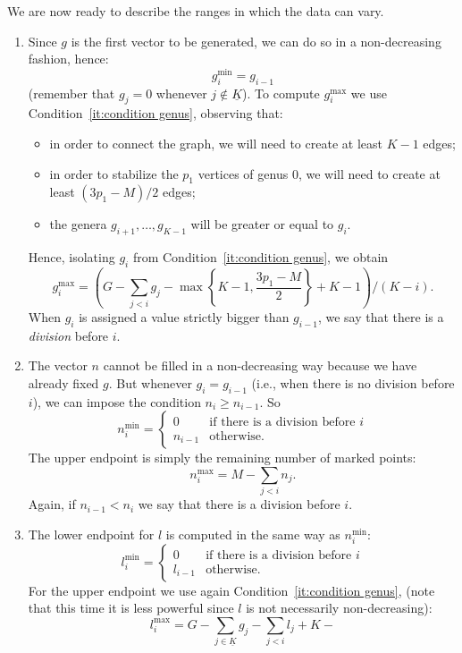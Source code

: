 \documentclass{amsart}
\theoremstyle{plain}
\theoremstyle{definition}
\DeclareMathOperator{\MAX}{max}
\newcommand{\ubar}[1]{\underline{#1}}
\begin{document}
We are now ready to describe the ranges in which the data can vary.
\begin{enumerate}
\item Since $g$ is the first vector to be generated, we can do so in a
  non-decreasing fashion, hence:
  \[
  g_i^{\min} = g_{i-1}
  \]
  (remember that $g_j = 0$ whenever $j \not\in \ubar{K}$). To compute
  $g_i^{\MAX}$ we use Condition~\ref{it:condition genus}, observing
  that:
  \begin{itemize}
  \item in order to connect the graph, we will need to create at least
    $K-1$ edges;
  \item in order to stabilize the $p_1$ vertices of genus $0$, we will
    need to create at least $(3p_1 - M)/2$ edges;
  \item the genera $g_{i+1}, \ldots, g_{K-1}$ will be greater or equal
    to $g_i$.
  \end{itemize}
  Hence, isolating $g_i$ from Condition~\ref{it:condition genus}, we
  obtain
  \[
  g^{\MAX}_i = \left(G - \sum_{j < i} g_j - \max\left\{K-1, \frac{3p_1
        - M}{2}\right\} + K - 1\right) / (K-i)\text{.}
  \]
  When $g_i$ is assigned a value strictly bigger than $g_{i-1}$, we
  say that there is a \emph{division\/} before $i$.
\item The vector $n$ cannot be filled in a non-decreasing way because
  we have already fixed $g$. But whenever $g_i = g_{i-1}$ (i.e., when
  there is no division before $i$), we can impose the condition $n_i
  \geq n_{i-1}$. So
  \[
  n_i^{\min} =
  \begin{cases}
    0 & \text{if there is a division before $i$}\\
    n_{i-1} & \text{otherwise.}
  \end{cases}
  \]
  The upper endpoint is simply the remaining number of marked
  points:
  \[
  n_i^{\MAX} = M - \sum_{j < i} n_j\text{.}
  \]
  Again, if $n_{i-1} < n_i$ we say that there is a division before
  $i$.
\item The lower endpoint for $l$ is computed in the same way as
  $n_i^{\min}$:
  \[
  l_i^{\min} =
  \begin{cases}
    0 & \text{if there is a division before $i$}\\
    l_{i-1} & \text{otherwise.}
  \end{cases}
  \]
  For the upper endpoint we use again Condition~\ref{it:condition
    genus}, (note that this time it is less powerful since $l$ is not
  necessarily non-decreasing): 
  \[
  l_i^{\MAX} = G - \sum_{j \in \ubar{K}} g_j - \sum_{j < i} l_j + K -
\]
\end{enumerate}
\end{document}
